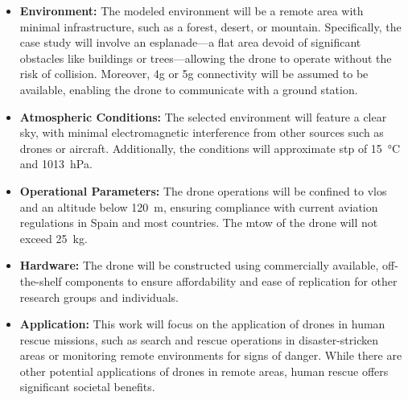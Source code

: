 \begin{itemize}
  \item \textbf{Environment:} The modeled environment will be a remote area with minimal infrastructure, such as a forest, desert, or mountain. Specifically, the case study will involve an esplanade—a flat area devoid of significant obstacles like buildings or trees—allowing the drone to operate without the risk of collision. Moreover, \gls{4g} or \gls{5g} connectivity will be assumed to be available, enabling the drone to communicate with a ground station.

  \item \textbf{Atmospheric Conditions:} The selected environment will feature a clear sky, with minimal electromagnetic interference from other sources such as drones or aircraft. Additionally, the conditions will approximate \gls{stp} of \SI{15}{\degreeCelsius} and \SI{1013}{\hecto\pascal}.

  \item \textbf{Operational Parameters:} The drone operations will be confined to \gls{vlos} and an altitude below \SI{120}{\metre}, ensuring compliance with current aviation regulations in Spain and most countries. The \gls{mtow} of the drone will not exceed \SI{25}{\kilogram}.

  \item \textbf{Hardware:} The drone will be constructed using commercially available, off-the-shelf components to ensure affordability and ease of replication for other research groups and individuals.

  \item \textbf{Application:} This work will focus on the application of drones in human rescue missions, such as search and rescue operations in disaster-stricken areas or monitoring remote environments for signs of danger. While there are other potential applications of drones in remote areas, human rescue offers significant societal benefits.
\end{itemize}
